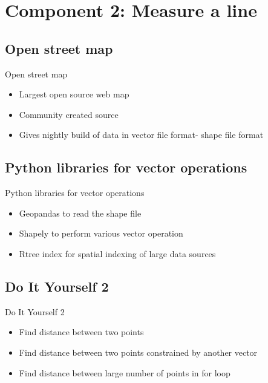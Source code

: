 \section[Component 2]{Component 2: Measure a line}
\subsection[Open street map]{Open street map}


\begin{frame}{Open street map}
	\begin{beamerboxesrounded}{}
		\begin{itemize}
			\item Largest open source web map
			\item Community created source
			\item Gives nightly build of data in vector file format- shape file format
		\end{itemize}
	\end{beamerboxesrounded}
\end{frame}


\subsection[Python libraries for vector operations]{Python libraries for vector operations}

\begin{frame}{Python libraries for vector operations}
\begin{beamerboxesrounded}{}
	\begin{itemize}
		\item Geopandas to read the shape file
		\item Shapely to perform various vector operation
		\item Rtree index for spatial indexing of large data sources
	\end{itemize}
\end{beamerboxesrounded}
\end{frame}

\subsection{Do It Yourself 2}


\begin{frame}{Do It Yourself 2}
\begin{beamerboxesrounded}{}
	\begin{itemize}
		\item Find distance between two points 
		\item Find distance between two points constrained by another vector \item Find distance between large number of points in for loop	
	\end{itemize}
\end{beamerboxesrounded}
\end{frame}